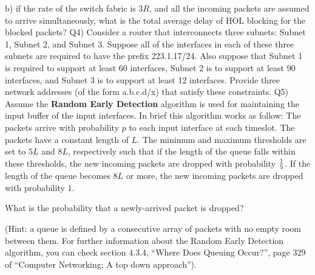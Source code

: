\documentclass[10pt,letterpaper]{article}
\begin{document}
b) if the rate of the switch fabric is $3R$, and all the incoming packets are assumed to arrive simultaneously, what is the total average delay of HOL blocking for the blocked packets?
\newline
\newline
Q4) Consider a router that interconnects three subnets: Subnet 1, Subnet 2, and Subnet 3. Suppose all of the interfaces in each of these three subnets are required to have the prefix 223.1.17/24. Also suppose that Subnet 1 is required to support at least 60 interfaces, Subnet 2 is to support at least 90 interfaces, and Subnet 3 is to support at least 12 interfaces. Provide three network addresses (of the form a.b.c.d/x) that satisfy these constraints.
\newline
\newline
Q5) Assume the \textbf{Random Early Detection} algorithm is used for maintaining the input buffer of the input interfaces.
In brief this algorithm works as follow: The packets arrive with probability $p$ to each input interface at each timeslot. The packets have a constant length of $L$. The minimum and maximum thresholds are set to $5L$ and $8L$, respectively such that if the length of the queue falls within these thresholds, the new incoming packets are dropped with probability $1\over 5$. If the length of the queue becomes $8L$ or more, the new incoming packets are dropped with probability $1$. 

What is the probability that a newly-arrived packet is dropped?

(Hint: a queue is defined by a consecutive array of packets with no empty room between them. For further information about the Random Early Detection algorithm, you can check section 4.3.4, ``Where Does Queuing Occur?'', page 329 of ``Computer Networking; A top down approach'').
\end{document}
